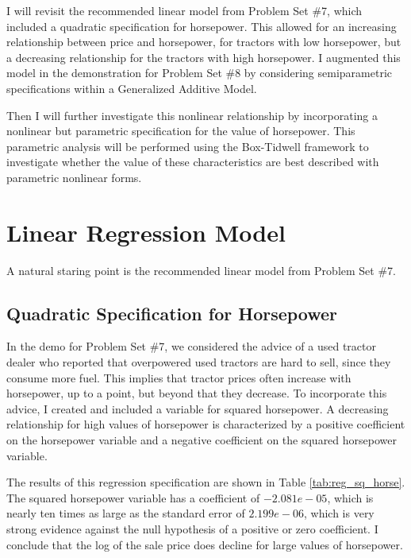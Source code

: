 \documentclass[11pt]{paper}
\begin{document}
I will revisit the recommended linear model
from Problem Set \#7, 
which included a quadratic specification for horsepower.
This allowed for an increasing relationship 
between price and horsepower, 
for tractors with low horsepower, 
but a decreasing relationship for the tractors with high horsepower. 
I augmented this model in the demonstration for 
Problem Set \#8 
by considering semiparametric specifications
within a Generalized Additive Model. 


Then I will further investigate this nonlinear relationship
by incorporating a nonlinear but parametric specification
for the value of horsepower. 
This parametric analysis will be performed
using the Box-Tidwell framework
to investigate whether the value of these characteristics
are best described with parametric nonlinear forms. 

\clearpage
\section{Linear Regression Model}

A natural staring point is the recommended linear model
from Problem Set \#7. 

\subsection{Quadratic Specification for Horsepower}

In the demo for Problem Set \#7, 
we considered the advice of
a used tractor dealer who reported that overpowered used tractors are hard to sell, since they consume more fuel. 
This implies that tractor prices often increase with horsepower, up to a point, but beyond that they decrease. 
To incorporate this advice, I created and included a variable for squared horsepower. 
A decreasing relationship for high values of horsepower
is characterized by 
a positive coefficient on the horsepower variable and
a negative coefficient on the squared horsepower variable. 

% 

% 
The results of this regression specification are shown in 
Table \ref{tab:reg_sq_horse}. 
%
The squared horsepower variable has a coefficient of $-2.081e-05$, which is nearly ten times as large as the standard error of $2.199e-06$, which is very strong evidence against the null hypothesis of a positive or zero coefficient. 
I conclude that the log of the sale price does decline for large values of horsepower. 
\end{document}
